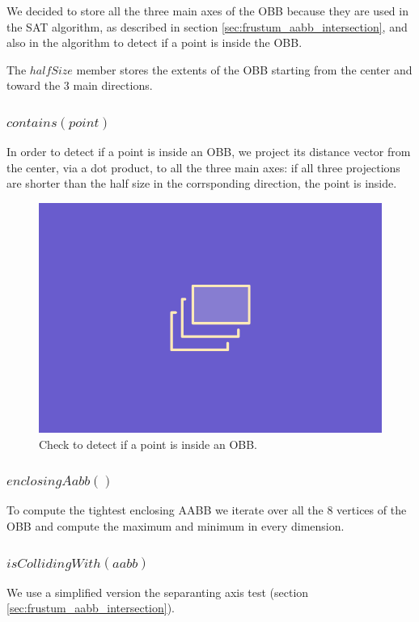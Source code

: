 \documentclass{PoliMi_MasterThesis}
\begin{document}
We decided to store all the three main axes of the OBB because they are used in the SAT algorithm, as described in section \ref{sec:frustum_aabb_intersection}, and also in the algorithm to detect if a point is inside the OBB.

The $halfSize$ member stores the extents of the OBB starting from the center and toward the 3 main directions.

\subsubsection*{$contains(point)$}
In order to detect if a point is inside an OBB, we project its distance vector from the center, via a dot product, to all the three main axes: if all three projections are shorter than the half size in the corrsponding direction, the point is inside.

\begin{figure}[H]
    \centering
    \includegraphics[width=\textwidth*\real{0.5}]{Images/TODO.png}
    \caption{Check to detect if a point is inside an OBB.}
    \label{fig:oobb_contains}
\end{figure}

\subsubsection*{$enclosingAabb()$}
To compute the tightest enclosing AABB we iterate over all the 8 vertices of the OBB and compute the maximum and minimum in every dimension.

\subsubsection*{$isCollidingWith(aabb)$}
We use a simplified version the separanting axis test (section \ref{sec:frustum_aabb_intersection}).
\end{document}
